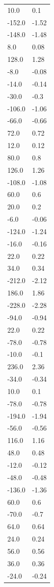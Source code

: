 \begin{longtable}{ll}
10.0 & 0.1 \\
-152.0 & -1.52 \\
-148.0 & -1.48 \\
8.0 & 0.08 \\
128.0 & 1.28 \\
-8.0 & -0.08 \\
-14.0 & -0.14 \\
-30.0 & -0.3 \\
-106.0 & -1.06 \\
-66.0 & -0.66 \\
72.0 & 0.72 \\
12.0 & 0.12 \\
80.0 & 0.8 \\
126.0 & 1.26 \\
-108.0 & -1.08 \\
60.0 & 0.6 \\
20.0 & 0.2 \\
-6.0 & -0.06 \\
-124.0 & -1.24 \\
-16.0 & -0.16 \\
22.0 & 0.22 \\
34.0 & 0.34 \\
-212.0 & -2.12 \\
186.0 & 1.86 \\
-228.0 & -2.28 \\
-94.0 & -0.94 \\
22.0 & 0.22 \\
-78.0 & -0.78 \\
-10.0 & -0.1 \\
236.0 & 2.36 \\
-34.0 & -0.34 \\
10.0 & 0.1 \\
-78.0 & -0.78 \\
-194.0 & -1.94 \\
-56.0 & -0.56 \\
116.0 & 1.16 \\
48.0 & 0.48 \\
-12.0 & -0.12 \\
-48.0 & -0.48 \\
-136.0 & -1.36 \\
60.0 & 0.6 \\
-70.0 & -0.7 \\
64.0 & 0.64 \\
24.0 & 0.24 \\
56.0 & 0.56 \\
36.0 & 0.36 \\
-24.0 & -0.24 \\

\end{longtable}
